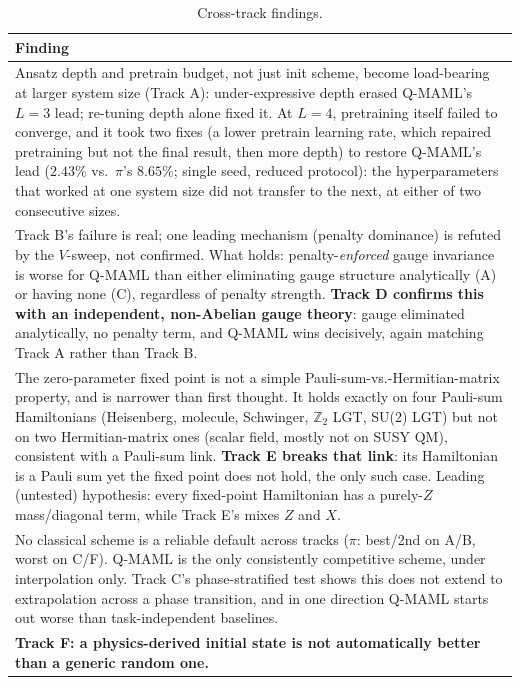 \documentclass[11pt]{article}
\begin{document}
\begin{table}[ht]
\centering\small
\caption{Cross-track findings.}
\label{tab:cross-track}
\begin{tabular}{p{}}
\toprule
\textbf{Finding} \\
\midrule
Ansatz depth and pretrain budget, not just init scheme, become load-bearing at larger system size (Track A):
under-expressive depth erased Q-MAML's $L{=}3$ lead; re-tuning depth alone fixed it. At $L{=}4$, pretraining
itself failed to converge, and it took two fixes (a lower pretrain learning rate, which repaired pretraining
but not the final result, then more depth) to restore Q-MAML's lead ($2.43\%$ vs.\ $\pi$'s $8.65\%$; single
seed, reduced protocol): the hyperparameters that worked at one system size did not transfer to the next,
at either of two consecutive sizes. \\
\midrule
Track B's failure is real; one leading mechanism (penalty dominance) is refuted by the $V$-sweep, not
confirmed. What holds: penalty-\emph{enforced} gauge invariance is worse for Q-MAML than either eliminating
gauge structure analytically (A) or having none (C), regardless of penalty strength. \textbf{Track D
confirms this with an independent, non-Abelian gauge theory}: gauge eliminated analytically, no penalty
term, and Q-MAML wins decisively, again matching Track A rather than Track B. \\
\midrule
The zero-parameter fixed point is not a simple Pauli-sum-vs.-Hermitian-matrix property, and is narrower
than first thought. It holds exactly on four Pauli-sum Hamiltonians (Heisenberg, molecule, Schwinger,
$\mathbb{Z}_2$ LGT, SU(2) LGT) but not on two Hermitian-matrix ones (scalar field, mostly not on SUSY QM),
consistent with a Pauli-sum link. \textbf{Track E breaks that link}: its Hamiltonian is a Pauli sum yet
the fixed point does not hold, the only such case. Leading (untested) hypothesis: every fixed-point
Hamiltonian has a purely-$Z$ mass/diagonal term, while Track E's mixes $Z$ and $X$. \\
\midrule
No classical scheme is a reliable default across tracks ($\pi$: best/2nd on A/B, worst on C/F). Q-MAML is
the only consistently competitive scheme, under interpolation only. Track C's phase-stratified test shows
this does not extend to extrapolation across a phase transition, and in one direction Q-MAML starts out
worse than task-independent baselines. \\
\midrule
\textbf{Track F: a physics-derived initial state is not automatically better than a generic random one.}

\end{tabular}
\end{table}
\end{document}

